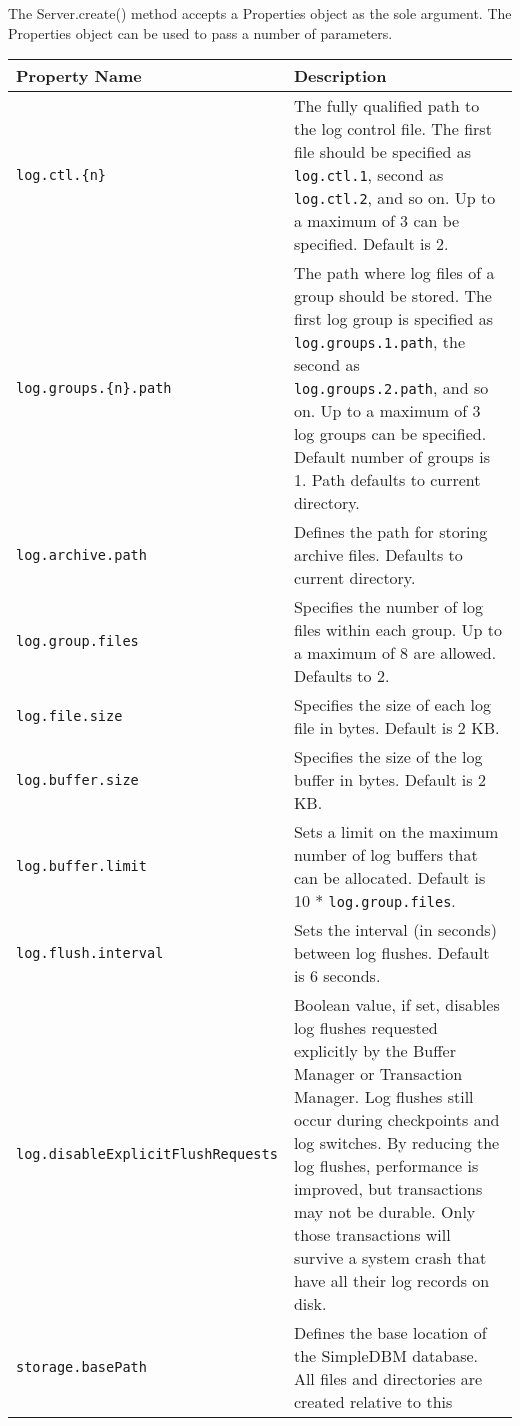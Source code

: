 \documentclass[a4paper,draft,oneside]{book}
\begin{document}
The Server.create() method accepts a Properties object as
the sole argument. The Properties object can be used to pass a
number of parameters. 

\begin{table}[h]
\begin{tabular}{|l|p{6cm}|}
  \hline
  \textbf{Property Name}&\textbf{Description}  \\
  \hline 
  \verb|log.ctl.{n}|&The fully qualified path to the
  log control file. The first file should be specified as
  \verb|log.ctl.1|, second as \verb|log.ctl.2|, and so on. Up to a
  maximum of 3 can be specified. Default is 2. \\
  \hline
  \verb|log.groups.{n}.path|&The path where log
  files of a group should be stored. The first log group is specified
  as \verb|log.groups.1.path|, the second as \verb|log.groups.2.path|,
  and so on. Up to a maximum of 3 log groups can be specified. Default
  number of groups is 1. Path defaults to current directory.  \\
  \hline
  \verb|log.archive.path|&Defines the path for storing archive files. 
  Defaults to current directory.  \\
  \hline
  \verb|log.group.files|&Specifies the number of log files within each group.
  Up to a maximum of 8 are allowed. Defaults to 2. \\
  \hline 
  \verb|log.file.size|&Specifies the size of each log file in
  bytes. Default is 2 KB. \\
  \hline 
  \verb|log.buffer.size|&Specifies the size of the log buffer
  in bytes. Default is 2 KB. \\
  \hline 
  \verb|log.buffer.limit|&Sets a limit on the maximum number of
  log buffers that can be allocated. Default is 10 *
  \verb|log.group.files|.  \\
  \hline 
  \verb|log.flush.interval|&Sets the interval (in seconds)
  between log flushes. Default is 6 seconds.  \\
  \hline 
  \verb|log.disableExplicitFlushRequests|&Boolean value, if set, disables 
  log flushes requested explicitly by the Buffer Manager or Transaction 
  Manager. Log flushes still occur during checkpoints and log switches. 
  By reducing the log flushes, performance is improved, but transactions 
  may not be durable. Only those transactions will survive a system crash 
  that have all their log records on disk.  \\
  \hline 
  \verb|storage.basePath|&Defines the base location of the
  SimpleDBM database. All files and directories are created relative to this

\end{tabular}
\end{table}
\end{document}
